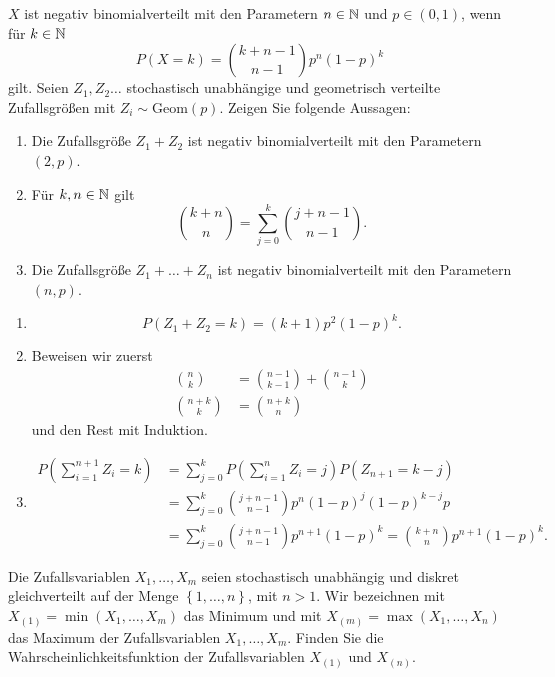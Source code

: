  $X$ ist negativ
binomialverteilt mit den Parametern $n\in\mathbb N$ und $p\in \left( 0,1 \right)$, wenn
für $k\in\mathbb N$
\begin{equation*}
    P(X = k) = \binom{k+n-1}{n-1} p^{n} (1-p)^{k} 
\end{equation*}
gilt. Seien $Z_1,Z_2\dots$ stochastisch unabhängige und geometrisch verteilte Zufallsgrößen mit 
$Z_i \sim \text{Geom}(p)$. Zeigen Sie folgende Aussagen: 
\begin{enumerate}
    \item Die Zufallsgröße $Z_1+Z_2$ ist negativ binomialverteilt mit den
        Parametern $(2,p)$. 
    \item Für $k, n \in\mathbb N$ gilt
        \begin{equation*}
            \binom{k+n}{n} = \sum_{j=0}^{k} \binom{j+n-1}{n-1}.
        \end{equation*}
    \item Die Zufallsgröße $Z_1+\dots+Z_n$ ist negativ binomialverteilt mit den
        Parametern $(n,p)$. 
\end{enumerate}

\solution
\begin{enumerate}
    \item \begin{equation*}
            P\left( Z_1+Z_2 = k \right) = (k+1)p^{2}(1-p)^k.
        \end{equation*}
    \item Beweisen wir zuerst
        \begin{align*}
            \binom{n}{k} &= \binom{n-1}{k-1} + \binom{n-1}{k} \\
            \binom{n+k}{k} &= \binom{n+k}{n}
        \end{align*}
        und den Rest mit Induktion.
    \item \begin{align*}
            P\left( \sum_{i=1}^{n+1} Z_i = k \right) &= 
            \sum_{j=0}^{k} P\left( \sum_{i=1}^{n} Z_i = j \right) P\left( Z_{n+1} =k-j \right) \\
            &= \sum_{j=0}^{k} \binom{j+n-1}{n-1} p^{n}(1-p)^{j} (1-p)^{k-j}p \\
            &= \sum_{j=0}^{k} \binom{j+n-1}{n-1} p^{n+1}(1-p)^{k} = \binom{k+n}{n} p^{n+1}(1-p)^{k}. 
        \end{align*}
\end{enumerate}


 Die Zufallsvariablen
$X_1,\dots ,X_m$ seien stochastisch unabhängig und diskret gleichverteilt auf der Menge
$\left\{ 1,\dots ,n \right\}$, mit $n>1$. Wir bezeichnen mit $X_{(1)} = \min
(X_1,\dots ,X_m)$ das Minimum und mit $X_{(m)} = \max \left( X_1,\dots ,X_n
\right)$ das Maximum der Zufallsvariablen $X_1,\dots ,X_m$.
Finden Sie die Wahrscheinlichkeitsfunktion der Zufallsvariablen
        $X_{(1)}$ und $X_{(n)}$.

